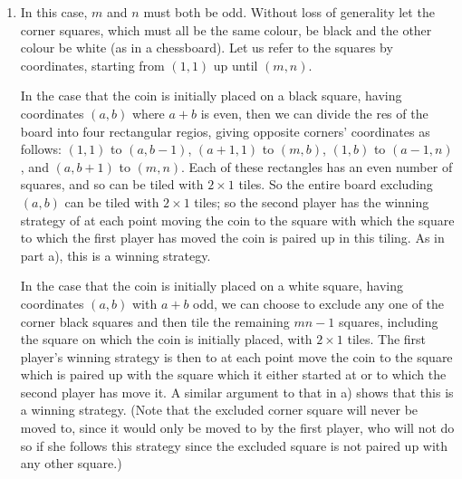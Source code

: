 \documentclass{article}
\begin{document}
\begin{enumerate}
{\begin{enumerate}[1.]
The first player's winning strategy is as follows: in each move, she should move the coin from the square in which the coin currently is (let us call this square $A$) to the square which is paired up with that square (let us call this square $B$). This is possible in the first move, since at that point all squares are available except for the one in which the coin starts, and assuming that the first player continues with this strategy it will be possible at each point thereafter; indeed, the only way that it would not be possible is if square $B$ had already been occupied at some point in the past, either by her (which since she has been following this strategy would only happen if the second player had already occupied square $A$ at some point in the past, which is impossible) or by the second player (in which case the first player would have already occupied square $A$ in the past, so the second player could not now have moved into square $A$). So the first player can always make a valid move, and so she cannot lose; but since the game must end, with the number of unoccupied squares always decreasing, the second player must eventually not be able to move, in which case the first player will win.

\item In this case, $m$ and $n$ must both be odd. Without loss of generality let the corner squares, which must all be the same colour, be black and the other colour be white (as in a chessboard). Let us refer to the squares by coordinates, starting from $(1, 1)$ up until $(m, n)$.

In the case that the coin is initially placed on a black square, having coordinates $(a, b)$ where $a + b$ is even, then we can divide the res of the board into four rectangular regios, giving opposite corners' coordinates as follows: $(1, 1)$ to $(a, b - 1)$, $(a + 1, 1)$ to $(m, b)$, $(1, b)$ to $(a - 1, n)$, and $(a, b + 1)$ to $(m, n)$. Each of these rectangles has an even number of squares, and so can be tiled with $2 \times 1$ tiles. So the entire board excluding $(a, b)$ can be tiled with $2 \times 1$ tiles; so the second player has the winning strategy of at each point moving the coin to the square with which the square to which the first player has moved the coin is paired up in this tiling. As in part a), this is a winning strategy.

In the case that the coin is initially placed on a white square, having coordinates $(a, b)$ with $a + b$ odd, we can choose to exclude any one of the corner black squares and then tile the remaining $mn - 1$ squares, including the square on which the coin is initially placed, with $2 \times 1$ tiles. The first player's winning strategy is then to at each point move the coin to the square which is paired up with the square which it either started at or to which the second player has move it. A similar argument to that in a) shows that this is a winning strategy. (Note that the excluded corner square will never be moved to, since it would only be moved to by the first player, who will not do so if she follows this strategy since the excluded square is not paired up with any other square.)


\end{enumerate}}
\end{enumerate}
\end{document}
